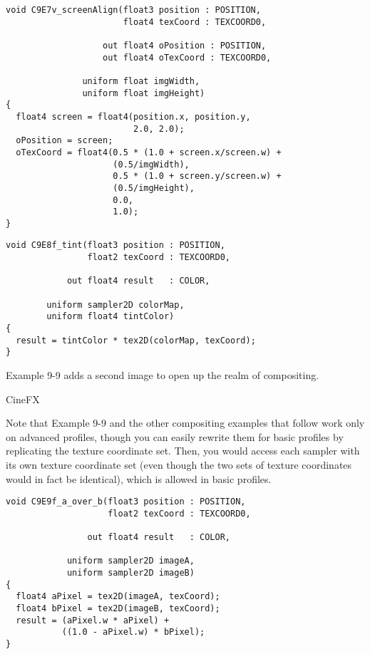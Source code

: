 \documentclass[../main.tex]{subfiles}
\begin{document}
\begin{lstlisting}[caption=Example 9-7. The \textbf{C9E7v_screenAlign} Vertex Program]
void C9E7v_screenAlign(float3 position : POSITION,
                       float4 texCoord : TEXCOORD0,

                   out float4 oPosition : POSITION,
                   out float4 oTexCoord : TEXCOORD0,

               uniform float imgWidth,
               uniform float imgHeight)
{
  float4 screen = float4(position.x, position.y,
                         2.0, 2.0);
  oPosition = screen;
  oTexCoord = float4(0.5 * (1.0 + screen.x/screen.w) +
                     (0.5/imgWidth),
                     0.5 * (1.0 + screen.y/screen.w) +
                     (0.5/imgHeight),
                     0.0,
                     1.0);
}
\end{lstlisting}

\begin{lstlisting}[caption=Example 9-8. The \textbf{C9E8f_tint} Fragment Program]
void C9E8f_tint(float3 position : POSITION,
                float2 texCoord : TEXCOORD0,

            out float4 result   : COLOR,

        uniform sampler2D colorMap,
        uniform float4 tintColor)
{
  result = tintColor * tex2D(colorMap, texCoord);
}
\end{lstlisting}

Example 9-9 adds a second image to open up the realm of compositing.

\begin{framed}
CineFX

Note that Example 9-9 and the other compositing examples that follow work only on advanced profiles, though you can easily rewrite them for basic profiles by replicating the texture coordinate set. Then, you would access each sampler with its own texture coordinate set (even though the two sets of texture coordinates would in fact be identical), which is allowed in basic profiles.
\end{framed}

\begin{lstlisting}[caption=Example 9-9. The \textbf{C9E9f_a_over_b} Fragment Program]
void C9E9f_a_over_b(float3 position : POSITION,
                    float2 texCoord : TEXCOORD0,

                out float4 result   : COLOR,

            uniform sampler2D imageA,
            uniform sampler2D imageB)
{
  float4 aPixel = tex2D(imageA, texCoord);
  float4 bPixel = tex2D(imageB, texCoord);
  result = (aPixel.w * aPixel) +
           ((1.0 - aPixel.w) * bPixel);
}
\end{lstlisting}
\end{document}
